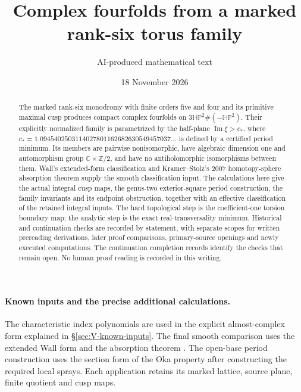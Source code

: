 \title{Complex fourfolds from a marked rank-six torus family}
\author{AI-produced mathematical text}
\date{18 November 2026}
\maketitle

\begin{abstract}
The marked rank-six monodromy with finite orders five and four and its
primitive maximal cusp produces compact complex fourfolds on
$3\mathbb{HP}^2\#(-\mathbb{HP}^2)$. Their explicitly normalized family
is parametrized by the half-plane $\operatorname{Im}\xi>c_*$, where
$c_*=1.0945402503114027801162682630549457037\ldots$ is defined by
a certified period minimum. Its members are pairwise nonisomorphic,
have algebraic dimension one and automorphism group
$\mathbb C\times\mathbb Z/2$, and have no antiholomorphic
isomorphisms between them. Wall's extended-form classification and
Kramer--Stolz's 2007 homotopy-sphere absorption theorem supply the
smooth classification input. The calculations here give the actual
integral cusp maps, the genus-two exterior-square period construction,
the family invariants and its endpoint obstruction, together with an
effective classification of the retained integral inputs. The hard
topological step is the coefficient-one torsion boundary map; the
analytic step is the exact real-transversality minimum. Historical and continuation
checks are recorded by statement, with separate scopes for written
prereading derivations, later proof comparisons, primary-source
openings and newly executed computations. The continuation completion
records identify the checks that remain open. No human proof reading
is recorded in this writing.
\end{abstract}

\paragraph{Known inputs and the precise additional calculations.}
The characteristic index polynomials are used in the explicit
almost-complex form explained in \S\ref{sec:V-known-inputs}.
The final smooth comparison uses the extended Wall form
\cite[Definition 3.6 and Theorem 3.7(1), pp.~12--14]{IVVWallForm}
and the absorption theorem
\cite[Theorem A, p.~178]{IVVKramerStolz}.
The open-base period construction uses the section form of the Oka
property \cite[Definition 7.7, p.~22; Proposition 7.13(d), p.~24]{IVVOkaOneV5}
after constructing the required local sprays. Each application retains
its marked lattice, source plane, finite quotient and cusp maps.

